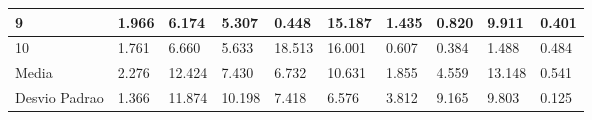 \begin{table}[!h]
{\begin{tabular}{|l|l|l|l|l|l|l|l|l|l|}
9             & 1.966           & 6.174                 & 5.307                 & 0.448           & 15.187                & 1.435                 & 0.820           & 9.911                 & 0.401                 \\ \hline
10            & 1.761           & 6.660                 & 5.633                 & 18.513          & 16.001                & 0.607                 & 0.384           & 1.488                 & 0.484                 \\ \hline
Media         & 2.276           & 12.424                & 7.430                 & 6.732           & 10.631                & 1.855                 & 4.559           & 13.148                & 0.541                 \\ \hline
Desvio Padrao & 1.366           & 11.874                & 10.198                & 7.418           & 6.576                 & 3.812                 & 9.165           & 9.803                 & 0.125                 \\ \hline
\end{tabular}%
}
\end{table}
